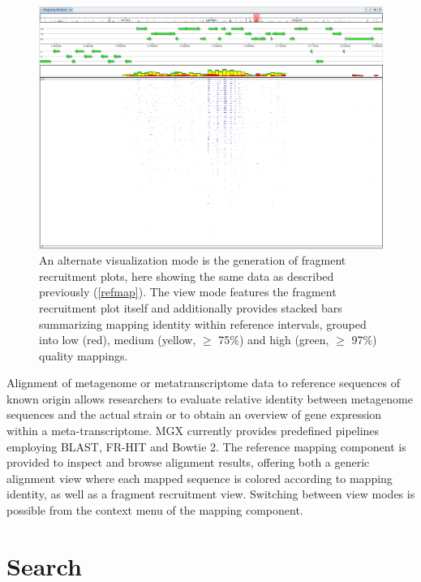 \begin{figure}[H]
\centering
\includegraphics[width=\textwidth]{img/mgx/FragRecruitment}
\caption[Fragment recruitment]{An alternate visualization mode is the generation of fragment recruitment plots, here showing the
same data as described previously (\ref{refmap}). The view mode features the fragment recruitment plot itself and additionally
provides stacked bars summarizing mapping identity within reference intervals, grouped into low (red), medium (yellow, $\ge$ 75\%) and
high (green, $\ge$ 97\%) quality mappings.}
\label{fragrec}
\end{figure}


Alignment of metagenome or metatranscriptome data to reference sequences of known origin allows researchers to evaluate
relative identity between metagenome sequences and the actual strain or to obtain an overview of gene expression within
a meta-transcriptome. MGX currently provides predefined pipelines employing BLAST\cite{BLAST}, FR-HIT\cite{FRHIT} and Bowtie 2\cite{BOWTIE}.
The reference mapping component is provided to inspect and browse alignment results, offering both a generic alignment view
where each mapped sequence is colored according to mapping identity, as well as a fragment recruitment view. Switching between
view modes is possible from the context menu of the mapping component.

\section{Search}

